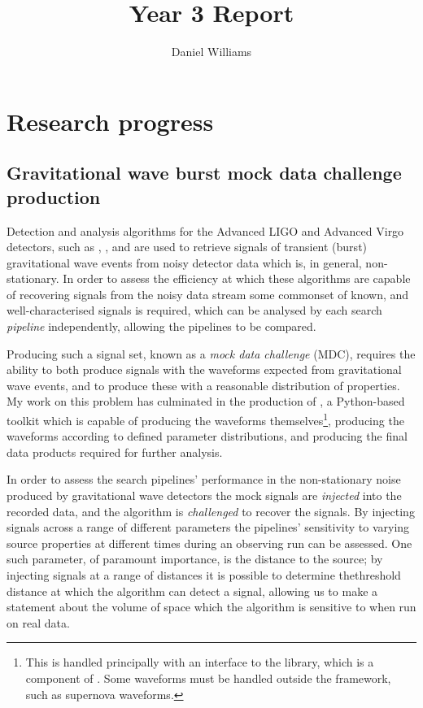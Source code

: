 \documentclass[openleft]{kentigern}
\title{Year 3 Report}
\author{Daniel Williams}
\theoremstyle{definition}
\begin{document}
\maketitle

\chapter{Research progress}
\chapterprecis{}
\section{Gravitational wave burst mock data challenge production}

Detection and analysis algorithms for the Advanced LIGO and Advanced
Virgo detectors, such as \cwb{}\cite{2008CQGra..25k4029K},
\olib{}\cite{2015arXiv151105955L}, and
\bayeswave{}\cite{2015CQGra..32m5012C} are used to retrieve signals
of transient (burst) gravitational wave events from noisy detector
data which is, in general, non-stationary. In order to assess the
efficiency at which these algorithms are capable of recovering signals
from the noisy data stream some commonset of known, and well-characterised
signals is required, which can be analysed by each search
\emph{pipeline} independently, allowing the pipelines to be compared.

Producing such a signal set, known as a \emph{mock data challenge}
(MDC), requires the ability to both produce signals with the waveforms
expected from gravitational wave events, and to produce these with a
reasonable distribution of properties. My work on this problem has
culminated in the production of \minke{}\cite{minkepaper}, a
Python-based toolkit which is capable of producing the waveforms
themselves\footnote{This is handled principally with an interface to
  the \lalsimulation{} library, which is a component of \lalsuite{}. Some
  waveforms must be handled outside the \lalsimulation{} framework, such
  as supernova waveforms.}, producing the waveforms according to
defined parameter distributions, and producing the final data products
required for further analysis.

In order to assess the search pipelines' performance in the
non-stationary noise produced by gravitational wave detectors the mock
signals are \emph{injected} into the recorded data, and the algorithm
is \emph{challenged} to recover the signals. By injecting signals
across a range of different parameters the pipelines' sensitivity to
varying source properties at different times during an observing run
can be assessed. One such parameter, of paramount importance, is the
distance to the source; by injecting signals at a range of distances
it is possible to determine thethreshold distance at which the
algorithm can detect a signal, allowing us to make a statement about
the volume of space which the algorithm is sensitive to when run on
real data.
\end{document}
